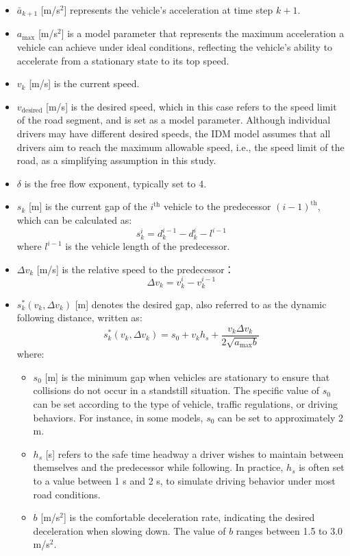 \begin{itemize}
    \item \(\bar a_{k+1}\) [m/s$^2$] represents the vehicle's acceleration at time step $k+1$.
    \item \(a_{\text{max}}\) [m/s$^2$] is a model parameter that represents the maximum acceleration a vehicle can achieve under ideal conditions, reflecting the vehicle's ability to accelerate from a stationary state to its top speed.
    \item \(v_k\) [m/s] is the current speed.
    \item \(v_{\text{desired}}\) [m/s] is the desired speed, which in this case refers to the speed limit of the road segment, and is set as a model parameter. Although individual drivers may have different desired speeds, the IDM model assumes that all drivers aim to reach the maximum allowable speed, i.e., the speed limit of the road, as a simplifying assumption in this study.
    \item \(\delta\) is the free flow exponent, typically set to 4.
    \item \(s_k\) [m] is the current gap of the $i^\text{th}$ vehicle to the predecessor ${(i-1)}^\text{th}$, which can be calculated as:
    \begin{equation}
        s_k^i = d_k^{i-1} - d_k^i - l^{i-1}
    \end{equation}
    where $l^{i-1}$ is the vehicle length of the predecessor.
    \item \(\Delta v_k\) [m/s] is the relative speed to the predecessor：
    \begin{equation}
        \Delta v_k = v_k^{i} - v_k^{i-1}
    \end{equation}
    \item \(s_k^*(v_k, \Delta v_k)\) [m] denotes the desired gap, also referred to as the dynamic following distance, written as:
    \begin{equation}
    s_k^*(v_k, \Delta v_k) = s_0 + v_k h_s + \frac{v_k\Delta v_k}{2\sqrt{a_{\text{max}}b}}
    \end{equation}
    where:
    \begin{itemize}
        \item \(s_0\) [m] is the minimum gap when vehicles are stationary to ensure that collisions do not occur in a standstill situation. The specific value of \(s_0\) can be set according to the type of vehicle, traffic regulations, or driving behaviors. For instance, in some models, \(s_0\) can be set to approximately 2 m.
        \item \(h_s\) [s] refers to the safe time headway a driver wishes to maintain between themselves and the predecessor while following. In practice, \(h_s\) is often set to a value between 1 s and 2 s, to simulate driving behavior under most road conditions.
        \item \(b\) [m/s$^2$] is the comfortable deceleration rate, indicating the desired deceleration when slowing down. The value of \(b\) ranges between 1.5 to 3.0 m/s$^2$.
    \end{itemize}
\end{itemize}

